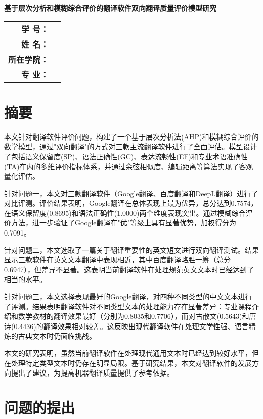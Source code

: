 \documentclass[bwprint]{cumcmthesis}
\newcommand{\studentid}{24103219} %
\newcommand{\studentname}{贺江阳} %
\newcommand{\college}{人工智能学院} %
\newcommand{\major}{软件工程} %
\renewcommand{\maketitle}{
  \begin{titlepage}
    \begin{center}
      \vspace*{2cm}
      {\huge\bfseries 基于层次分析和模糊综合评价的翻译软件双向翻译质量评价模型研究\par}
      \vspace{2cm}
      
      \begin{tabular}{rl}
        \Large\textbf{学 \quad 号：} & \Large\underline{\makebox[8cm]{\studentid}} \\[12pt]
        \Large\textbf{姓 \quad 名：} & \Large\underline{\makebox[8cm]{\studentname}} \\[12pt]
        \Large\textbf{所在学院：} & \Large\underline{\makebox[8cm]{\college}} \\[12pt]
        \Large\textbf{专 \quad 业：} & \Large\underline{\makebox[8cm]{\major}} \\[12pt]
      \end{tabular}
      
    \end{center}
  \end{titlepage}
}
\begin{document}
\maketitle

\newpage
\tableofcontents  %
\thispagestyle{plain}
\clearpage
\newpage
{}

\section*{摘要}

本文针对翻译软件评价问题，构建了一个基于层次分析法(AHP)和模糊综合评价的数学模型，通过"双向翻译"的方式对三款主流翻译软件进行了全面评估。模型设计了包括语义保留度(SP)、语法正确性(GC)、表达流畅性(EF)和专业术语准确性(TA)在内的多维评价指标体系，并通过余弦相似度、编辑距离等算法实现了客观量化评估。

针对问题一，本文对三款翻译软件（Google翻译、百度翻译和DeepL翻译）进行了对比评测。评价结果表明，Google翻译在总体表现上最为优异，总分达到0.7574，在语义保留度(0.8695)和语法正确性(1.0000)两个维度表现突出。通过模糊综合评价方法，进一步验证了Google翻译在"优"等级上具有显著优势，加权得分为0.7091。

针对问题二，本文选取了一篇关于翻译重要性的英文短文进行双向翻译测试。结果显示三款软件在英文文本翻译中表现相近，其中百度翻译略胜一筹（总分0.6947），但差异不显著。这表明当前翻译软件在处理规范英文文本时已经达到了相当的水平。

针对问题三，本文选择表现最好的Google翻译，对四种不同类型的中文文本进行了评测。结果表明翻译软件对不同类型文本的处理能力存在显著差异：专业课程介绍和数学教材的翻译效果最好（分别为0.8035和0.7706），而对古散文(0.5643)和唐诗(0.4436)的翻译效果相对较差。这反映出现代翻译软件在处理文学性强、语言精炼的古典文本时仍面临挑战。

本文的研究表明，虽然当前翻译软件在处理现代通用文本时已经达到较好水平，但在处理特定类型文本时仍存在明显局限。基于研究结果，本文对翻译软件的发展方向提出了建议，为提高机器翻译质量提供了参考依据。






\section{问题的提出}
\end{document}
